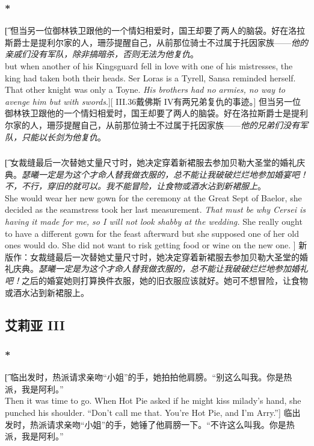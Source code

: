 \documentclass[12pt,a4paper]{article}
\begin{document}
\subsubsection{\color{red}*}\t[
	但当另一位御林铁卫跟他的一个情妇相爱时，国王却要了两人的脑袋。好在洛拉斯爵士是提利尔家的人，珊莎提醒自己，从前那位骑士不过属于托因家族——\emph{他的亲戚们没有军队，除非搞暗杀，否则无法为他复仇}。\\
	but when another of his Kingsguard fell in love with one of his mistresses, the king had taken both their heads. Ser Loras is a Tyrell, Sansa reminded herself. That other knight was only a Toyne. \emph{His brothers had no armies, no way to avenge him but with swords}.][
	III.36戴佛斯 IV有两兄弟复仇的事迹。]
	但当另一位御林铁卫跟他的一个情妇相爱时，国王却要了两人的脑袋。好在洛拉斯爵士是提利尔家的人，珊莎提醒自己，从前那位骑士不过属于托因家族——\emph{他的兄弟们没有军队，只能以长剑为他复仇}。
	
\subsubsection{}\t[
	女裁缝最后一次替她丈量尺寸时，她决定穿着新裙服去参加贝勒大圣堂的婚礼庆典。\emph{瑟曦一定是为这个才命人替我做衣服的，总不能让我破破烂烂地参加婚宴吧！不，不行，穿旧的就可以。我不能冒险，让食物或酒水沾到新裙服上}。\\
	She would wear her new gown for the ceremony at the Great Sept of Baelor, she decided as the seamstress took her last measurement. \emph{That must be why Cersei is having it made for me, so I will not look shabby at the wedding.} She really ought to have a different gown for the feast afterward but she supposed one of her old ones would do. She did not want to risk getting food or wine on the new one. ]
	新版作：女裁缝最后一次替她丈量尺寸时，她决定穿着新裙服去参加贝勒大圣堂的婚礼庆典。\emph{瑟曦一定是为这个才命人替我做衣服的，总不能让我破破烂烂地参加婚礼吧！}之后的婚宴她则打算换件衣服，她的旧衣服应该就好。她可不想冒险，让食物或酒水沾到新裙服上。
	
\subsection{艾莉亚 III}
\subsubsection{\color{red}*}\t[		
临出发时，热派请求亲吻“小姐”的手，她拍拍他肩膀。“别这么叫我。你是热派，我是阿利。”\\		
Then it was time to go. When Hot Pie asked if he might kiss milady's hand, she punched his shoulder. “Don't call me that. You're Hot Pie, and I'm Arry.”]		
临出发时，热派请求亲吻“小姐”的手，她锤了他肩膀一下。“不许这么叫我。你是热派，我是阿利。”
\end{document}
